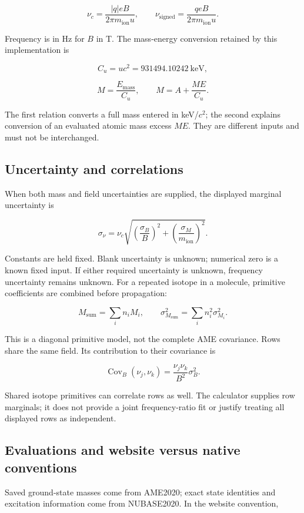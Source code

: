 \documentclass[
  aps,
  onecolumn,
  11pt]{revtex4-2}
\begin{document}
\[\nu_c=\frac{|q|eB}{2\pi m_{\mathrm{ion}}u},\qquad \nu_{\mathrm{signed}}=\frac{qeB}{2\pi m_{\mathrm{ion}}u}.\]

Frequency is in Hz for \(B\) in T. The mass-energy conversion retained
by this implementation is

\[C_u=uc^2=931494.10242\ {\mathrm{keV}},\]

\[M=\frac{E_{\mathrm{mass}}}{C_u},\qquad M=A+\frac{ME}{C_u}.\]

The first relation converts a full mass entered in keV/\(c^2\); the
second explains conversion of an evaluated atomic mass excess \(ME\).
They are different inputs and must not be interchanged.

\subsection{Uncertainty and
correlations}\label{uncertainty-and-correlations}

When both mass and field uncertainties are supplied, the displayed
marginal uncertainty is

\[\sigma_{\nu}=\nu_c\sqrt{\left(\frac{\sigma_B}{B}\right)^2+\left(\frac{\sigma_M}{m_{\mathrm{ion}}}\right)^2}.\]

Constants are held fixed. Blank uncertainty is unknown; numerical zero
is a known fixed input. If either required uncertainty is unknown,
frequency uncertainty remains unknown. For a repeated isotope in a
molecule, primitive coefficients are combined before propagation:

\[M_{\mathrm{sum}}=\sum_i n_iM_i,\qquad \sigma_{M_{\mathrm{sum}}}^2=\sum_i n_i^2\sigma_{M_i}^2.\]

This is a diagonal primitive model, not the complete AME covariance.
Rows share the same field. Its contribution to their covariance is

\[\operatorname{Cov}_B(\nu_j,\nu_k)=\frac{\nu_j\nu_k}{B^2}\sigma_B^2.\]

Shared isotope primitives can correlate rows as well. The calculator
supplies row marginals; it does not provide a joint frequency-ratio fit
or justify treating all displayed rows as independent.

\subsection{Evaluations and website versus native
conventions}\label{evaluations-and-website-versus-native-conventions}

Saved ground-state masses come from AME2020; exact state identities and
excitation information come from NUBASE2020. In the website convention,
\end{document}
